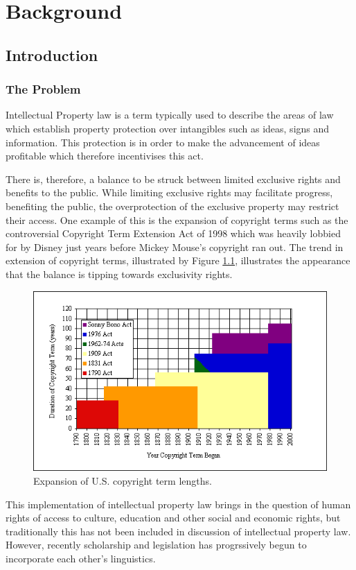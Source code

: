 \chapter{Background}
	\section{Introduction}
		\subsection{The Problem}
			Intellectual Property law is a term typically used to describe the areas of law which establish property protection over intangibles such as ideas, signs and information. This protection is in order to make the advancement of ideas profitable which therefore incentivises this act\cite{ip_edu_bently}.
			
			There is, therefore, a balance to be struck between limited exclusive rights and benefits to the public. While limiting exclusive rights may facilitate progress, benefiting the public, the overprotection of the exclusive property may restrict their access\cite{handbook_ip_hr_geiger}. One example of this is the expansion of copyright terms such as the controversial Copyright Term Extension Act of 1998 which was heavily lobbied for by Disney just years before Mickey Mouse's copyright ran out\cite{mickey_mouse_grzelak}. The trend in extension of copyright terms, illustrated by Figure \ref{fig:ext_us_cop}, illustrates the appearance that the balance is tipping towards exclusivity rights. 

			\begin{figure}[h]
    			\centering
    			\includegraphics[width=0.5\linewidth]{resources/images/extention_of_us_copyright.png}
    			\caption{Expansion of U.S. copyright term lengths\cite{copyright_term_length_graph_bell}.}
    			\label{fig:ext_us_cop}
			\end{figure}
			
			This implementation of intellectual property law brings in the question of human rights of access to culture, education and other social and economic rights, but traditionally this has not been included in discussion of intellectual property law\cite{mapping_ip_hr_helfer}. However, recently scholarship and legislation has progrssively begun to incorporate each other's linguistics\cite{bileta_proposal_blakely}.
			
